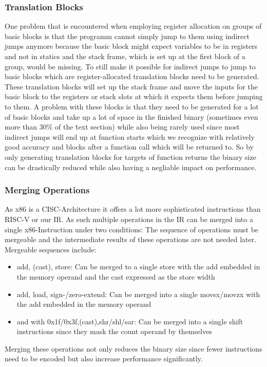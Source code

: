 \documentclass[course=eragp]{aspdoc}
\begin{document}
\subsubsection{Translation Blocks}\label{translation_blocks}
One problem that is encountered when employing register allocation on groups of basic blocks is that the programm cannot simply jump to them using indirect jumps anymore because the basic block might expect variables to be in registers
and not in statics and the stack frame, which is set up at the first block of a group, would be missing. To still make it possible for indirect jumps to jump to basic blocks which are register-allocated translation blocks need to be generated.
These translation blocks will set up the stack frame and move the inputs for the basic block to the registers or stack slots at which it expects them before jumping to them.
A problem with these blocks is that they need to be generated for a lot of basic blocks and take up a lot of space in the finished binary (sometimes even more than 30\% of the \.text section) while also being rarely used
since most indirect jumps will end up at function starts which we recognize with relatively good accuracy and blocks after a function call which will be returned to.
So by only generating translation blocks for targets of function returns the binary size can be drastically reduced while also having a negliable impact on performance.

\subsubsection{Merging Operations}
As x86 is a CISC-Architecture it offers a lot more sophisticated instructions than RISC-V or our IR. As such multiple operations in the IR can be merged into a single x86-Instruction under two conditions:
The sequence of operations must be mergeable and the intermediate results of these operations are not needed later.
Mergeable sequences include:
\begin{itemize}
    \item add, (cast), store: Can be merged to a single store with the add embedded in the memory operand and the cast expressed as the store width
    \item add, load, sign-/zero-extend: Can be merged into a single movsx/movzx with the add embedded in the memory operand
    \item and with 0x1f/0x3f,(cast),shr/shl/sar: Can be merged into a single shift instructions since they mask the count operand by themselves
\end{itemize}
Merging these operations not only reduces the binary size since fewer instructions need to be encoded but also increase performance significantly.
\end{document}
